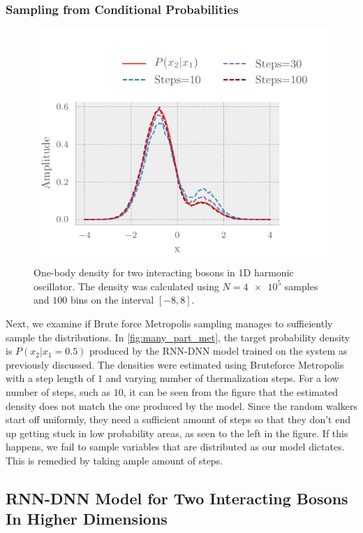 \subsubsection{Sampling from Conditional Probabilities}

\begin{figure}[H]
	\includegraphics[]{figures/many_part_met.pdf}
	\caption{One-body density for two interacting bosons in 1D harmonic
      oscillator. The density was calculated using $N=\num{4e5}$ samples and $100$
      bins on the interval $[-8,8]$.} 
	\label{fig:many_part_met}
\end{figure}

Next, we examine if Brute force Metropolis sampling manages to 
sufficiently sample the distributions.
In \autoref{fig:many_part_met}, the target probability density is
$P(x_2|x_1=0.5)$ produced by the RNN-DNN model trained on the system as
previously discussed. The densities were estimated using Bruteforce Metropolis
with a step length of $1$ and varying number of thermalization steps. For a
low number of steps, such as $10$, it can be seen from the figure that the
estimated density does not match the one produced by the model. Since the random
walkers start off uniformly, they need a sufficient amount of steps so that they
don't end up getting stuck in low probability areas, as seen to the left in the
figure. If this happens, we fail to sample variables that are distributed as our
model dictates. This is remedied by taking ample amount of steps.
\subsection{RNN-DNN Model for Two Interacting Bosons In Higher Dimensions}

